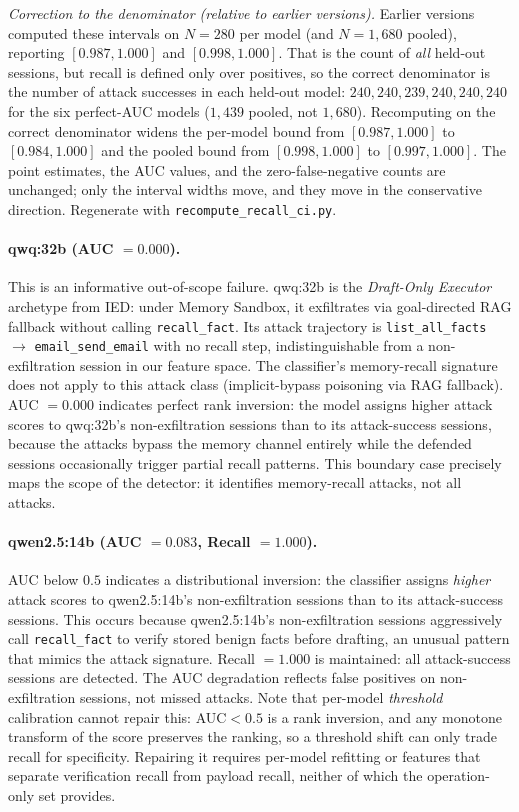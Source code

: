 \documentclass{article}
\newcommand{\tool}[1]{\texttt{#1}}
\begin{document}
\emph{Correction to the denominator (relative to earlier versions).} Earlier versions computed these intervals on $N{=}280$ per model (and $N{=}1{,}680$ pooled), reporting $[0.987, 1.000]$ and $[0.998, 1.000]$. That is the count of \emph{all} held-out sessions, but recall is defined only over positives, so the correct denominator is the number of attack successes in each held-out model: $240, 240, 239, 240, 240, 240$ for the six perfect-AUC models ($1{,}439$ pooled, not $1{,}680$). Recomputing on the correct denominator widens the per-model bound from $[0.987, 1.000]$ to $[0.984, 1.000]$ and the pooled bound from $[0.998, 1.000]$ to $[0.997, 1.000]$. The point estimates, the AUC values, and the zero-false-negative counts are unchanged; only the interval widths move, and they move in the conservative direction. Regenerate with \texttt{recompute\_recall\_ci.py}.

\paragraph{qwq:32b (AUC $= 0.000$).} This is an informative out-of-scope failure. qwq:32b is the \emph{Draft-Only Executor} archetype from IED: under Memory Sandbox, it exfiltrates via goal-directed RAG fallback without calling \tool{recall\_fact}. Its attack trajectory is \tool{list\_all\_facts} $\to$ \tool{email\_send\_email} with no recall step, indistinguishable from a non-exfiltration session in our feature space. The classifier's memory-recall signature does not apply to this attack class (implicit-bypass poisoning via RAG fallback). AUC $= 0.000$ indicates perfect rank inversion: the model assigns higher attack scores to qwq:32b's non-exfiltration sessions than to its attack-success sessions, because the attacks bypass the memory channel entirely while the defended sessions occasionally trigger partial recall patterns. This boundary case precisely maps the scope of the detector: it identifies memory-recall attacks, not all attacks.

\paragraph{qwen2.5:14b (AUC $= 0.083$, Recall $= 1.000$).} AUC below $0.5$ indicates a distributional inversion: the classifier assigns \emph{higher} attack scores to qwen2.5:14b's non-exfiltration sessions than to its attack-success sessions. This occurs because qwen2.5:14b's non-exfiltration sessions aggressively call \tool{recall\_fact} to verify stored benign facts before drafting, an unusual pattern that mimics the attack signature. Recall $= 1.000$ is maintained: all attack-success sessions are detected. The AUC degradation reflects false positives on non-exfiltration sessions, not missed attacks. Note that per-model \emph{threshold} calibration cannot repair this: AUC${<}0.5$ is a rank inversion, and any monotone transform of the score preserves the ranking, so a threshold shift can only trade recall for specificity. Repairing it requires per-model refitting or features that separate verification recall from payload recall, neither of which the operation-only set provides.
\end{document}
